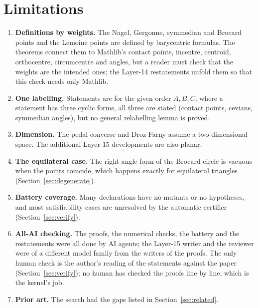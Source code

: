 \documentclass[11pt]{article}
\theoremstyle{definition}
\theoremstyle{remark}
\begin{document}
\section{Limitations}\label{sec:limits}
\begin{enumerate}
\item \textbf{Definitions by weights.} The Nagel, Gergonne, symmedian and Brocard points and the
Lemoine points are defined by barycentric formulas. The theorems connect them to Mathlib's contact
points, incentre, centroid, orthocentre, circumcentre and angles, but a reader must check that the
weights are the intended ones; the Layer-14 restatements unfold them so that this check needs only
Mathlib.
\item \textbf{One labelling.} Statements are for the given order $A,B,C$; where a statement has three
cyclic forms, all three are stated (contact points, cevians, symmedian angles), but no general
relabelling lemma is proved.
\item \textbf{Dimension.} The pedal converse and Droz-Farny assume a two-dimensional space. The
additional Layer-15 developments are also planar.
\item \textbf{The equilateral case.} The right-angle form of the Brocard circle is vacuous when the
points coincide, which happens exactly for equilateral triangles (Section~\ref{sec:degenerate}).
\item \textbf{Battery coverage.} Many declarations have no mutants or no hypotheses, and most
satisfiability cases are unresolved by the automatic certifier (Section~\ref{sec:verify}).
\item \textbf{All-AI checking.} The proofs, the numerical checks, the battery and the restatements
were all done by AI agents; the Layer-15 writer and the reviewer were of a different model family
from the writers of the proofs. The only human check is the author's reading of the statements against
the paper (Section~\ref{sec:verify}); no human has checked the proofs line by line, which is the
kernel's job.
\item \textbf{Prior art.} The search had the gaps listed in Section~\ref{sec:related}.
\end{enumerate}
\end{document}
